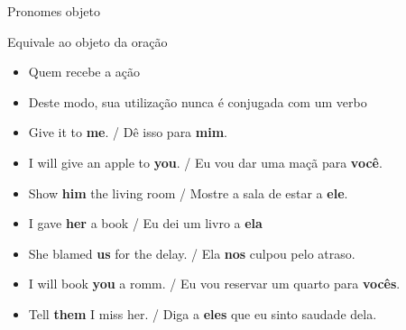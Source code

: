 \documentclass[compress,mathserif,xcolor=table]{beamer}
\begin{document}
\begin{frame}{Pronomes objeto}

Equivale ao objeto da oração
\begin{itemize}
    \item Quem recebe a ação
    \item Deste modo, sua utilização nunca é conjugada com um verbo
\end{itemize}

\vspace{0.5cm}

\begin{itemize}
    \item Give it to \textbf{me}. / Dê isso para \textbf{mim}.
    \item I will give an apple to \textbf{you}. / Eu vou dar uma maçã para \textbf{você}.
    \item Show \textbf{him} the living room / Mostre a sala de estar a \textbf{ele}.
    \item I gave \textbf{her} a book / Eu dei um livro a \textbf{ela}
    \item She blamed \textbf{us} for the delay. / Ela \textbf{nos} culpou pelo atraso.
    \item I will book \textbf{you} a romm. / Eu vou reservar um quarto para \textbf{vocês}.
    \item Tell \textbf{them} I miss her. / Diga a \textbf{eles} que eu sinto saudade dela.
\end{itemize}

\end{frame}

\end{document}

